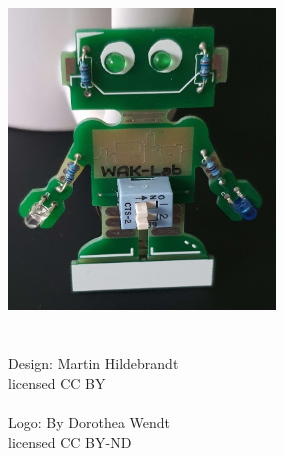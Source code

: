 \documentclass[a4paper]{article}
\begin{document}
\maketitle
\begin{center}
\includegraphics[height=8cm]{../pictures/RoboAus.jpg}
\ \\
\ \\
\ \\
Design: Martin Hildebrandt\\
licensed CC BY\\
\ \\
Logo: By Dorothea Wendt\\
licensed CC BY-ND\\
\end{center}
\newpage
\end{document}

